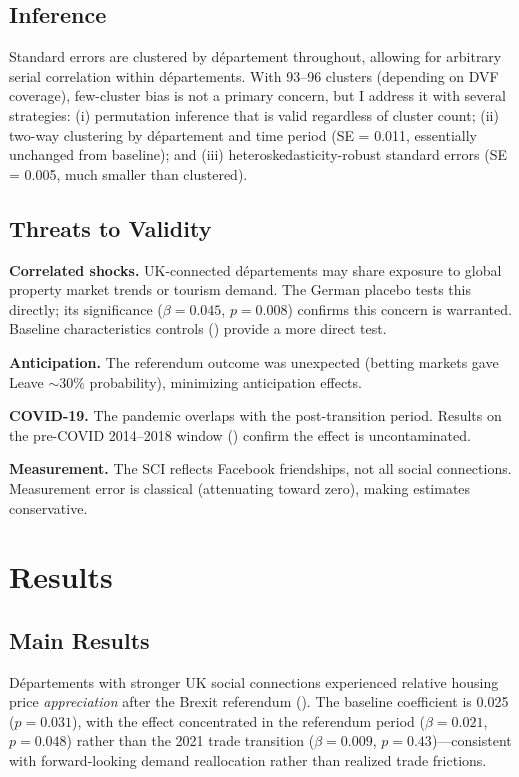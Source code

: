 \documentclass[12pt]{article}
\begin{document}
\subsection{Inference}

Standard errors are clustered by d\'epartement throughout, allowing for arbitrary serial correlation within d\'epartements. With 93--96 clusters (depending on DVF coverage), few-cluster bias is not a primary concern, but I address it with several strategies: (i) permutation inference that is valid regardless of cluster count; (ii) two-way clustering by d\'epartement and time period (SE = 0.011, essentially unchanged from baseline); and (iii) heteroskedasticity-robust standard errors (SE = 0.005, much smaller than clustered).

\subsection{Threats to Validity}

\textbf{Correlated shocks.} UK-connected d\'epartements may share exposure to global property market trends or tourism demand. The German placebo tests this directly; its significance ($\beta = 0.045$, $p = 0.008$) confirms this concern is warranted. Baseline characteristics controls () provide a more direct test.

\textbf{Anticipation.} The referendum outcome was unexpected (betting markets gave Leave $\sim$30\% probability), minimizing anticipation effects.

\textbf{COVID-19.} The pandemic overlaps with the post-transition period. Results on the pre-COVID 2014--2018 window () confirm the effect is uncontaminated.

\textbf{Measurement.} The SCI reflects Facebook friendships, not all social connections. Measurement error is classical (attenuating toward zero), making estimates conservative.


\section{Results}

\subsection{Main Results}

D\'epartements with stronger UK social connections experienced relative housing price \textit{appreciation} after the Brexit referendum (). The baseline coefficient is 0.025 ($p = 0.031$), with the effect concentrated in the referendum period ($\beta = 0.021$, $p = 0.048$) rather than the 2021 trade transition ($\beta = 0.009$, $p = 0.43$)---consistent with forward-looking demand reallocation rather than realized trade frictions.
\end{document}
